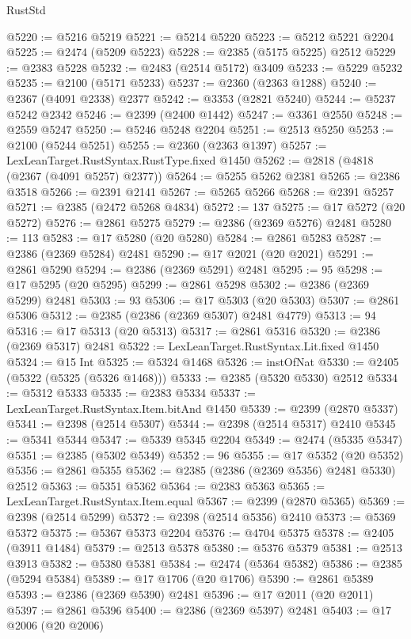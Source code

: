 \begin{lexlean}{RustStd}
\begin{coremodule}
{\begin{coremodule}
{{{{{{{{{{{{{{{{{{{{{{{{{{{{{{{{{{{{{{{{{{{{{{{{{{@5220 := @5216 @5219
@5221 := @5214 @5220
@5223 := @5212 @5221 @2204
@5225 := @2474 (@5209 @5223)
@5228 := @2385 (@5175 @5225) @2512
@5229 := @2383 @5228
@5232 := @2483 (@2514 @5172) @3409
@5233 := @5229 @5232
@5235 := @2100 (@5171 @5233)
@5237 := @2360 (@2363 @1288)
@5240 := @2367 (@4091 @2338) @2377
@5242 := @3353 (@2821 @5240)
@5244 := @5237 @5242 @2342
@5246 := @2399 (@2400 @1442)
@5247 := @3361 @2550
@5248 := @2559 @5247
@5250 := @5246 @5248 @2204
@5251 := @2513 @5250
@5253 := @2100 (@5244 @5251)
@5255 := @2360 (@2363 @1397)
@5257 := LexLeanTarget.RustSyntax.RustType.fixed @1450
@5262 := @2818 (@4818 (@2367 (@4091 @5257) @2377))
@5264 := @5255 @5262 @2381
@5265 := @2386 @3518
@5266 := @2391 @2141
@5267 := @5265 @5266
@5268 := @2391 @5257
@5271 := @2385 (@2472 @5268 @4834)
@5272 := 137
@5275 := @17 @5272 (@20 @5272)
@5276 := @2861 @5275
@5279 := @2386 (@2369 @5276) @2481
@5280 := 113
@5283 := @17 @5280 (@20 @5280)
@5284 := @2861 @5283
@5287 := @2386 (@2369 @5284) @2481
@5290 := @17 @2021 (@20 @2021)
@5291 := @2861 @5290
@5294 := @2386 (@2369 @5291) @2481
@5295 := 95
@5298 := @17 @5295 (@20 @5295)
@5299 := @2861 @5298
@5302 := @2386 (@2369 @5299) @2481
@5303 := 93
@5306 := @17 @5303 (@20 @5303)
@5307 := @2861 @5306
@5312 := @2385 (@2386 (@2369 @5307) @2481 @4779)
@5313 := 94
@5316 := @17 @5313 (@20 @5313)
@5317 := @2861 @5316
@5320 := @2386 (@2369 @5317) @2481
@5322 := LexLeanTarget.RustSyntax.Lit.fixed @1450
@5324 := @15 Int
@5325 := @5324 @1468
@5326 := instOfNat
@5330 := @2405 (@5322 (@5325 (@5326 @1468)))
@5333 := @2385 (@5320 @5330) @2512
@5334 := @5312 @5333
@5335 := @2383 @5334
@5337 := LexLeanTarget.RustSyntax.Item.bitAnd @1450
@5339 := @2399 (@2870 @5337)
@5341 := @2398 (@2514 @5307)
@5344 := @2398 (@2514 @5317) @2410
@5345 := @5341 @5344
@5347 := @5339 @5345 @2204
@5349 := @2474 (@5335 @5347)
@5351 := @2385 (@5302 @5349)
@5352 := 96
@5355 := @17 @5352 (@20 @5352)
@5356 := @2861 @5355
@5362 := @2385 (@2386 (@2369 @5356) @2481 @5330) @2512
@5363 := @5351 @5362
@5364 := @2383 @5363
@5365 := LexLeanTarget.RustSyntax.Item.equal
@5367 := @2399 (@2870 @5365)
@5369 := @2398 (@2514 @5299)
@5372 := @2398 (@2514 @5356) @2410
@5373 := @5369 @5372
@5375 := @5367 @5373 @2204
@5376 := @4704 @5375
@5378 := @2405 (@3911 @1484)
@5379 := @2513 @5378
@5380 := @5376 @5379
@5381 := @2513 @3913
@5382 := @5380 @5381
@5384 := @2474 (@5364 @5382)
@5386 := @2385 (@5294 @5384)
@5389 := @17 @1706 (@20 @1706)
@5390 := @2861 @5389
@5393 := @2386 (@2369 @5390) @2481
@5396 := @17 @2011 (@20 @2011)
@5397 := @2861 @5396
@5400 := @2386 (@2369 @5397) @2481
@5403 := @17 @2006 (@20 @2006)
}}}}}}}}}}}}}}}}}}}}}}}}}}}}}}}}}}}}}}}}}}}}}}}}}}
\end{coremodule}}
\end{coremodule}
\end{lexlean}
